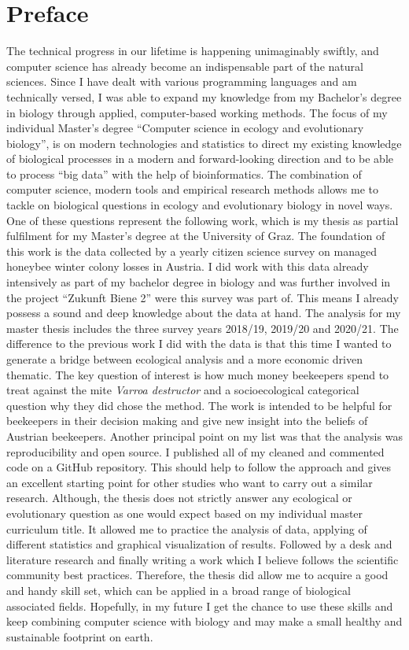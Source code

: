 \chapter*{Preface}
\label{sec:Preface}
\vspace*{-10mm}

The technical progress in our lifetime is happening unimaginably swiftly, and computer science has already become an indispensable part of the natural sciences. Since I have dealt with various programming languages and am technically versed, I was able to expand my knowledge from my Bachelor's degree in biology through applied, computer-based working methods. The focus of my individual Master's degree \enquote{Computer science in ecology and evolutionary biology}, is on modern technologies and statistics to direct my existing knowledge of biological processes in a modern and forward-looking direction and to be able to process \enquote{big data} with the help of bioinformatics. The combination of computer science, modern tools and empirical research methods allows me to tackle on biological questions in ecology and evolutionary biology in novel ways. One of these questions represent the following work, which is my thesis as partial fulfilment for my Master's degree at the University of Graz. The foundation of this work is the data collected by a yearly citizen science survey on managed honeybee winter colony losses in Austria. I did work with this data already intensively as part of my bachelor degree in biology and was further involved in the project \enquote{Zukunft Biene 2} were this survey was part of. This means I already possess a sound and deep knowledge about the data at hand. The analysis for my master thesis includes the three survey years 2018/19, 2019/20 and 2020/21. The difference to the previous work I did with the data is that this time I wanted to generate a bridge between ecological analysis and a more economic driven thematic. The key question of interest is how much money beekeepers spend to treat against the mite \textit{Varroa destructor} and a socioecological categorical question why they did chose the method. The work is intended to be helpful for beekeepers in their decision making and give new insight into the beliefs of Austrian beekeepers. Another principal point on my list was that the analysis was reproducibility and open source. I published all of my cleaned and commented code on a GitHub repository. This should help to follow the approach and gives an excellent starting point for other studies who want to carry out a similar research. Although, the thesis does not strictly answer any ecological or evolutionary question as one would expect based on my individual master curriculum title. It allowed me to practice the analysis of data, applying of different statistics and graphical visualization of results. Followed by a desk and literature research and finally writing a work which I believe follows the scientific community best practices. Therefore, the thesis did allow me to acquire a good and handy skill set, which can be applied in a broad range of biological associated fields. Hopefully, in my future I get the chance to use these skills and keep combining computer science with biology and may make a small healthy and sustainable footprint on earth.